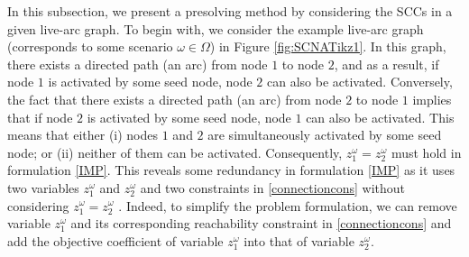 \documentclass[a4paper,10pt]{article}
\theoremstyle{plain}
\begin{document}
	In this subsection, we present a presolving method by considering the SCCs in a given live-arc graph.
	To begin with, we consider the example live-arc graph (corresponds to some scenario $\omega\in\Omega$) in Figure \ref{fig:SCNATikz1}.
	In this graph, there exists a directed path (an arc) from node $1$ to node $2$, 
	and as a result, if node $1$ is activated by some seed node, node $2$ can also be activated.
	Conversely, the fact that there exists a directed path (an arc) from node $2$ to node $1$ implies that if node $2$ is activated by some seed node, node $1$ can also be activated.
	This means that either (i) nodes $1$ and $2$ are simultaneously activated  by some seed node; or (ii) neither of them can be activated.
	Consequently, $z_1^\omega = z_2^\omega$ must hold in formulation \eqref{IMP}.
	This reveals some redundancy in formulation \eqref{IMP} as it uses two variables $z_1^\omega$ and $z_2^\omega$ 
	and two constraints in \eqref{connectioncons} without considering $z_1^\omega = z_2^\omega$ .
	Indeed, to simplify the problem formulation, we can remove variable $z_1^\omega$  and its corresponding reachability constraint in \eqref{connectioncons} and add the objective coefficient of variable $z_1^\omega$ into that of variable $z_2^\omega$.
	
\end{document}
